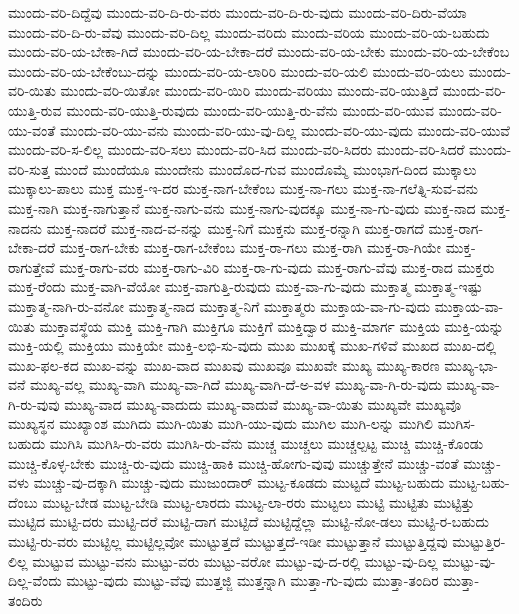 {ಮುಂದು-ವರಿ-ದಿದ್ದೆವು
ಮುಂದು-ವರಿ-ದಿ-ರು-ವರು
ಮುಂದು-ವರಿ-ದಿ-ರು-ವುದು
ಮುಂದು-ವರಿ-ದಿರು-ವೆಯಾ
ಮುಂದು-ವರಿ-ದಿ-ರು-ವೆವು
ಮುಂದು-ವರಿ-ದಿಲ್ಲ
ಮುಂದು-ವರಿದು
ಮುಂದು-ವರಿಯ
ಮುಂದು-ವರಿ-ಯ-ಬಹುದು
ಮುಂದು-ವರಿ-ಯ-ಬೇಕಾ-ಗಿದೆ
ಮುಂದು-ವರಿ-ಯ-ಬೇಕಾ-ದರೆ
ಮುಂದು-ವರಿ-ಯ-ಬೇಕು
ಮುಂದು-ವರಿ-ಯ-ಬೇಕೆಂಬ
ಮುಂದು-ವರಿ-ಯ-ಬೇಕೆಂಬು-ದನ್ನು
ಮುಂದು-ವರಿ-ಯ-ಲಾರಿರಿ
ಮುಂದು-ವರಿ-ಯಲಿ
ಮುಂದು-ವರಿ-ಯಲು
ಮುಂದು-ವರಿ-ಯಿತು
ಮುಂದು-ವರಿ-ಯಿತೋ
ಮುಂದು-ವರಿ-ಯಿರಿ
ಮುಂದು-ವರಿಯು
ಮುಂದು-ವರಿ-ಯುತ್ತಿದೆ
ಮುಂದು-ವರಿ-ಯುತ್ತಿ-ರುವ
ಮುಂದು-ವರಿ-ಯುತ್ತಿ-ರುವುದು
ಮುಂದು-ವರಿ-ಯುತ್ತಿ-ರು-ವೆನು
ಮುಂದು-ವರಿ-ಯುವ
ಮುಂದು-ವರಿ-ಯು-ವಂತೆ
ಮುಂದು-ವರಿ-ಯು-ವನು
ಮುಂದು-ವರಿ-ಯು-ವು-ದಿಲ್ಲ
ಮುಂದು-ವರಿ-ಯು-ವುದು
ಮುಂದು-ವರಿ-ಯುವೆ
ಮುಂದು-ವರಿ-ಸ-ಲಿಲ್ಲ
ಮುಂದು-ವರಿ-ಸಲು
ಮುಂದು-ವರಿ-ಸಿದ
ಮುಂದು-ವರಿ-ಸಿದರು
ಮುಂದು-ವರಿ-ಸಿದರೆ
ಮುಂದು-ವರಿ-ಸುತ್ತ
ಮುಂದೆ
ಮುಂದೆಯೂ
ಮುಂದೇನು
ಮುಂದೊದ-ಗುವ
ಮುಂದೊಮ್ಮೆ
ಮುಂಭಾಗ-ದಿಂದ
ಮುಕ್ಕಾಲು
ಮುಕ್ಕಾಲು-ಪಾಲು
ಮುಕ್ತ
ಮುಕ್ತ-ಇ-ದರ
ಮುಕ್ತ-ನಾಗ-ಬೇಕೆಂಬ
ಮುಕ್ತ-ನಾ-ಗಲು
ಮುಕ್ತ-ನಾ-ಗಲೆತ್ನಿ-ಸುವ-ವನು
ಮುಕ್ತ-ನಾಗಿ
ಮುಕ್ತ-ನಾಗುತ್ತಾನೆ
ಮುಕ್ತ-ನಾಗು-ವನು
ಮುಕ್ತ-ನಾಗು-ವುದಕ್ಕೂ
ಮುಕ್ತ-ನಾ-ಗು-ವುದು
ಮುಕ್ತ-ನಾದ
ಮುಕ್ತ-ನಾದನು
ಮುಕ್ತ-ನಾದರೆ
ಮುಕ್ತ-ನಾದ-ವ-ನನ್ನು
ಮುಕ್ತ-ನಿಗೆ
ಮುಕ್ತನು
ಮುಕ್ತ-ರನ್ನಾಗಿ
ಮುಕ್ತ-ರಾಗದೆ
ಮುಕ್ತ-ರಾಗ-ಬೇಕಾ-ದರೆ
ಮುಕ್ತ-ರಾಗ-ಬೇಕು
ಮುಕ್ತ-ರಾಗ-ಬೇಕೆಂಬ
ಮುಕ್ತ-ರಾ-ಗಲು
ಮುಕ್ತ-ರಾಗಿ
ಮುಕ್ತ-ರಾ-ಗಿಯೇ
ಮುಕ್ತ-ರಾಗುತ್ತೇವೆ
ಮುಕ್ತ-ರಾಗು-ವರು
ಮುಕ್ತ-ರಾಗು-ವಿರಿ
ಮುಕ್ತ-ರಾ-ಗು-ವುದು
ಮುಕ್ತ-ರಾಗು-ವೆವು
ಮುಕ್ತ-ರಾದ
ಮುಕ್ತರು
ಮುಕ್ತ-ರೆಂದು
ಮುಕ್ತ-ವಾಗಿ-ವೆಯೋ
ಮುಕ್ತ-ವಾಗುತ್ತಿ-ರುವುದು
ಮುಕ್ತ-ವಾ-ಗು-ವುದು
ಮುಕ್ತಾತ್ಮ
ಮುಕ್ತಾತ್ಮ-ಇಷ್ಟು
ಮುಕ್ತಾತ್ಮ-ನಾಗಿ-ರು-ವನೋ
ಮುಕ್ತಾತ್ಮ-ನಾದ
ಮುಕ್ತಾತ್ಮ-ನಿಗೆ
ಮುಕ್ತಾತ್ಮರು
ಮುಕ್ತಾಯ-ವಾ-ಗು-ವುದು
ಮುಕ್ತಾಯ-ವಾ-ಯಿತು
ಮುಕ್ತಾವಸ್ಥೆಯ
ಮುಕ್ತಿ
ಮುಕ್ತಿ-ಗಾಗಿ
ಮುಕ್ತಿಗೂ
ಮುಕ್ತಿಗೆ
ಮುಕ್ತಿದ್ವಾರ
ಮುಕ್ತಿ-ಮಾರ್ಗ
ಮುಕ್ತಿಯ
ಮುಕ್ತಿ-ಯನ್ನು
ಮುಕ್ತಿ-ಯಲ್ಲಿ
ಮುಕ್ತಿಯು
ಮುಕ್ತಿಯೇ
ಮುಕ್ತಿ-ಲಭಿ-ಸು-ವುದು
ಮುಖ
ಮುಖಕ್ಕೆ
ಮುಖ-ಗಳಿವೆ
ಮುಖದ
ಮುಖ-ದಲ್ಲಿ
ಮುಖ-ಫಲ-ಕದ
ಮುಖ-ವನ್ನು
ಮುಖ-ವಾದ
ಮುಖವು
ಮುಖವೂ
ಮುಖವೇ
ಮುಖ್ಯ
ಮುಖ್ಯ-ಕಾರಣ
ಮುಖ್ಯ-ಭಾ-ವನೆ
ಮುಖ್ಯ-ವಲ್ಲ
ಮುಖ್ಯ-ವಾಗಿ
ಮುಖ್ಯ-ವಾ-ಗಿದೆ
ಮುಖ್ಯ-ವಾಗಿ-ದೆ-ಅ-ವಳ
ಮುಖ್ಯ-ವಾ-ಗಿ-ರು-ವುದು
ಮುಖ್ಯ-ವಾ-ಗಿ-ರು-ವುವು
ಮುಖ್ಯ-ವಾದ
ಮುಖ್ಯ-ವಾದುದು
ಮುಖ್ಯ-ವಾದುವೆ
ಮುಖ್ಯ-ವಾ-ಯಿತು
ಮುಖ್ಯವೇ
ಮುಖ್ಯವೊ
ಮುಖ್ಯಸ್ಥನ
ಮುಖ್ಯಾಂಶ
ಮುಗಿದು
ಮುಗಿ-ಯಿತು
ಮುಗಿ-ಯು-ವುದು
ಮುಗಿಲ
ಮುಗಿ-ಲನ್ನು
ಮುಗಿಲಿ
ಮುಗಿಸ-ಬಹುದು
ಮುಗಿಸಿ
ಮುಗಿಸಿ-ರು-ವರು
ಮುಗಿಸಿ-ರು-ವೆನು
ಮುಚ್ಚ
ಮುಚ್ಚಲು
ಮುಚ್ಚಲ್ಪಟ್ಟ
ಮುಚ್ಚಿ
ಮುಚ್ಚಿ-ಕೊಂಡು
ಮುಚ್ಚಿ-ಕೊಳ್ಳ-ಬೇಕು
ಮುಚ್ಚಿ-ರು-ವುದು
ಮುಚ್ಚಿ-ಹಾಕಿ
ಮುಚ್ಚಿ-ಹೋಗು-ವುವು
ಮುಚ್ಚುತ್ತೇನೆ
ಮುಚ್ಚು-ವಂತೆ
ಮುಚ್ಚು-ವಳು
ಮುಚ್ಚು-ವು-ದಕ್ಕಾಗಿ
ಮುಚ್ಚು-ವುದು
ಮುಜುಂದಾರ್
ಮುಟ್ಟ-ಕೂಡದು
ಮುಟ್ಟದೆ
ಮುಟ್ಟ-ಬಹುದು
ಮುಟ್ಟ-ಬಹು-ದೆಂಬು
ಮುಟ್ಟ-ಬೇಡ
ಮುಟ್ಟ-ಬೇಡಿ
ಮುಟ್ಟ-ಲಾರದು
ಮುಟ್ಟ-ಲಾ-ರರು
ಮುಟ್ಟಲು
ಮುಟ್ಟಿ
ಮುಟ್ಟಿತು
ಮುಟ್ಟಿತ್ತು
ಮುಟ್ಟಿದ
ಮುಟ್ಟಿ-ದರು
ಮುಟ್ಟಿ-ದರೆ
ಮುಟ್ಟಿ-ದಾಗ
ಮುಟ್ಟಿದೆ
ಮುಟ್ಟಿದ್ದೆಲ್ಲಾ
ಮುಟ್ಟಿ-ನೋ-ಡಲು
ಮುಟ್ಟಿ-ರ-ಬಹುದು
ಮುಟ್ಟಿ-ರು-ವರು
ಮುಟ್ಟಿಲ್ಲ
ಮುಟ್ಟಿಲ್ಲವೋ
ಮುಟ್ಟುತ್ತದೆ
ಮುಟ್ಟುತ್ತದೆ-ಇಡೀ
ಮುಟ್ಟುತ್ತಾನೆ
ಮುಟ್ಟುತ್ತಿದ್ದವು
ಮುಟ್ಟುತ್ತಿರ-ಲಿಲ್ಲ
ಮುಟ್ಟುವ
ಮುಟ್ಟು-ವನು
ಮುಟ್ಟು-ವರು
ಮುಟ್ಟು-ವರೋ
ಮುಟ್ಟು-ವು-ದ-ರಲ್ಲಿ
ಮುಟ್ಟು-ವು-ದಿಲ್ಲ
ಮುಟ್ಟು-ವು-ದಿಲ್ಲ-ವೆಂದು
ಮುಟ್ಟು-ವುದು
ಮುಟ್ಟು-ವೆವು
ಮುತ್ತಜ್ಜಿ
ಮುತ್ತನ್ನಾಗಿ
ಮುತ್ತಾ-ಗು-ವುದು
ಮುತ್ತಾ-ತಂದಿರ
ಮುತ್ತಾ-ತಂದಿರು
}
